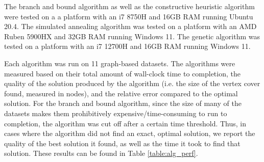 \documentclass[acmlarge]{acmart}
\begin{document}

The branch and bound algorithm as well as the constructive heuristic algorithm were tested on a a platform with an i7 8750H and 16GB RAM running Ubuntu 20.4. The simulated annealing algorithm was tested on a platform with an AMD Ruben 5900HX and 32GB RAM running Windows 11. The genetic algorithm was tested on a platform with an i7 12700H and 16GB RAM running Windows 11.

Each algorithm was run on 11 graph-based datasets. The algorithms were measured based on their total amount of wall-clock time to completion, the quality of the solution produced by the algorithm (i.e. the size of the vertex cover found, measured in nodes), and the relative error compared to the optimal solution. For the branch and bound algorithm, since the size of many of the datasets makes them prohibitively expensive/time-consuming to run to completion, the algorithm was cut off after a certain time threshold. Thus, in cases where the algorithm did not find an exact, optimal solution, we report the quality of the best solution it found, as well as the time it took to find that solution. These results can be found in Table \ref{table:alg_perf}.
\end{document}
